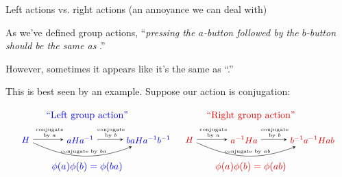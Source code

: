 \documentclass[8pt, handout]{beamer}
\newcommand{\Pause}{}      %
\begin{document}

\begin{frame}{Left actions vs. right actions (an annoyance we can deal with)} 
  
  As we've defined group actions, ``\emph{pressing the $a$-button
    followed by the $b$-button should be the same as }.''
  
  \medskip\Pause
  
  However, sometimes it appears like it's the same as
  ``\emph{}.''
  
  \medskip\Pause
  
  This is best seen by an example. Suppose our action is
  conjugation: \vspace{-3mm}
  
  \[
  \begin{tikzpicture}[scale=.5] 
    \tikzstyle{to} = [draw,-stealth]
    \begin{scope}[shift={(0,0)}]
      \node (H) at (0,0) {\small \color{xBlue}$H$};
      \node (aH) at (4,0) {\small \color{xBlue}$aHa^{-1}$};
      \node (baH) at (9,0) {\small \color{xBlue}$baHa^{-1}b^{-1}$};
      \draw[to] (H) to (aH);
      \draw[to] (aH) to (baH);
      \draw[to,bend right=23] (H) to (baH);
      \node at (1.75,.7) {\tiny conjugate};
      \node at (1.75,.3) {\tiny by $a$};
      \node at (6.25,.7) {\tiny conjugate};
      \node at (6.25,.3) {\tiny by $b$};
      \node at (4.25,-.88) {\tiny conjugate by $ba$};
      \node at (4.5,-2) {\Balert{$\phi(a)\phi(b)=\phi(ba)$}};
      \node at (4.5,1.75) {\Balert{``Left group action''}};
    \end{scope}
    \begin{scope}[shift={(12,0)}]
      \node (H) at (0,0) {\small \Alert{$H$}};
      \node (aH) at (4,0) {\small \Alert{$a^{-1}Ha$}};
      \node (baH) at (9,0) {\small \Alert{$b^{-1}a^{-1}Hab$}};
      \draw[to] (H) to (aH);
      \draw[to] (aH) to (baH);
      \draw[to,bend right=23] (H) to (baH);
      \node at (1.75,.7) {\tiny conjugate};
      \node at (1.75,.3) {\tiny by $a$};
      \node at (6.25,.7) {\tiny conjugate};
      \node at (6.25,.3) {\tiny by $b$};
      \node at (4.25,-.88) {\tiny conjugate by $ab$};
      \node at (4.5,-2) {\Alert{$\phi(a)\phi(b)=\phi(ab)$}};
      \node at (4.5,1.75) {\Alert{``Right group action''}};
    \end{scope}
  \end{tikzpicture}
  \]
  

\end{frame}
\end{document}
